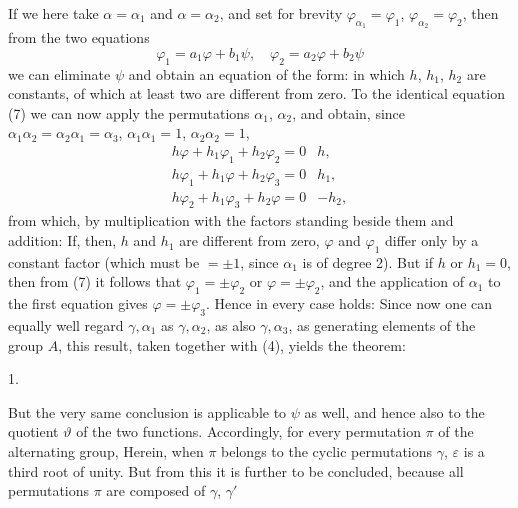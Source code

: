 If we here take $\alpha=\alpha_1$ and $\alpha=\alpha_2$, and set for
brevity $\varphi_{\alpha_1}=\varphi_1$, $\varphi_{\alpha_2}=\varphi_2$, then
from the two equations
\[
\varphi_1 = a_1\varphi + b_1\psi, \quad \varphi_2 = a_2\varphi + b_2\psi
\]
we can eliminate $\psi$ and obtain an equation of the form:
in which $h$, $h_1$, $h_2$ are constants, of which at least two are
different from zero. To the identical equation (7) we can now apply the
permutations $\alpha_1$, $\alpha_2$, and obtain, since
$\alpha_1\alpha_2 = \alpha_2\alpha_1 = \alpha_3$, $\alpha_1\alpha_1 = 1$,
$\alpha_2\alpha_2 = 1$,
\[
\begin{array}{l|l}
h\varphi + h_1\varphi_1 + h_2\varphi_2 = 0 & h,\\
h\varphi_1 + h_1\varphi + h_2\varphi_3 = 0 & h_1,\\
h\varphi_2 + h_1\varphi_3 + h_2\varphi = 0 & -h_2,
\end{array}
\]
from which, by multiplication with the factors standing beside them and
addition:
If, then, $h$ and $h_1$ are different from zero, $\varphi$ and $\varphi_1$
differ only by a constant factor (which must be $=\pm 1$, since $\alpha_1$
is of degree 2). But if $h$ or $h_1=0$, then from (7) it follows that
$\varphi_1=\pm\varphi_2$ or $\varphi=\pm\varphi_2$, and the application of
$\alpha_1$ to the first equation gives $\varphi=\pm\varphi_3$. Hence in
every case  holds:
Since now one can equally well regard $\gamma,\alpha_1$ as $\gamma,\alpha_2$,
as also $\gamma,\alpha_3$, as generating elements of the group $A$, this
result, taken together with (4), yields the theorem:

1. 

But the very same conclusion is applicable to $\psi$ as well, and hence
also to the quotient $\vartheta$ of the two functions. Accordingly, for
every permutation $\pi$ of the alternating group,
Herein, when $\pi$ belongs to the cyclic permutations $\gamma$,
$\varepsilon$ is a third root of unity. But from this it is further to be
concluded, because all permutations $\pi$ are composed of $\gamma$, $\gamma'$
